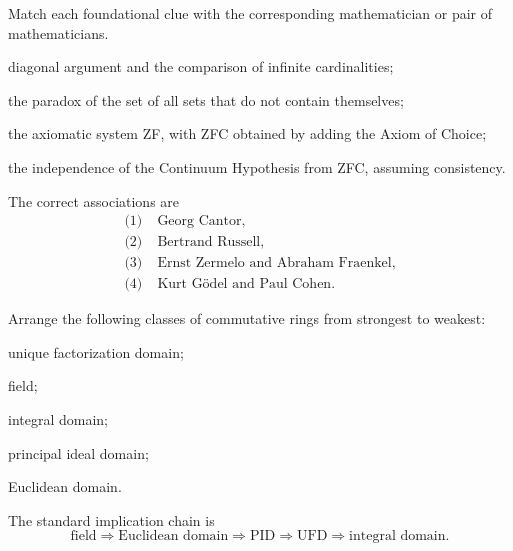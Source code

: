     \begin{expectedproblem}
        Match each foundational clue with the corresponding mathematician or
        pair of mathematicians.
        \begin{problemchoices}
            \item diagonal argument and the comparison of infinite
                  cardinalities;
            \item the paradox of the set of all sets that do not contain
                  themselves;
            \item the axiomatic system ZF, with ZFC obtained by adding the
                  Axiom of Choice;
            \item the independence of the Continuum Hypothesis from ZFC,
                  assuming consistency.
        \end{problemchoices}
    \end{expectedproblem}

    \begin{solution}
        The correct associations are
        \[
            \boxed{
                \begin{aligned}
                    \text{(1)}\;&\text{Georg Cantor},\\
                    \text{(2)}\;&\text{Bertrand Russell},\\
                    \text{(3)}\;&\text{Ernst Zermelo and Abraham Fraenkel},\\
                    \text{(4)}\;&\text{Kurt G\"odel and Paul Cohen}.
                \end{aligned}
            }
        \]
    \end{solution}

    \begin{expectedproblem}
        Arrange the following classes of commutative rings from strongest to
        weakest:
        \begin{problemchoices}
            \item unique factorization domain;
            \item field;
            \item integral domain;
            \item principal ideal domain;
            \item Euclidean domain.
        \end{problemchoices}
    \end{expectedproblem}

    \begin{solution}
        The standard implication chain is
        \[
            \boxed{
                \text{field}
                \Longrightarrow
                \text{Euclidean domain}
                \Longrightarrow
                \text{PID}
                \Longrightarrow
                \text{UFD}
                \Longrightarrow
                \text{integral domain}
            }.
        \]
    \end{solution}

